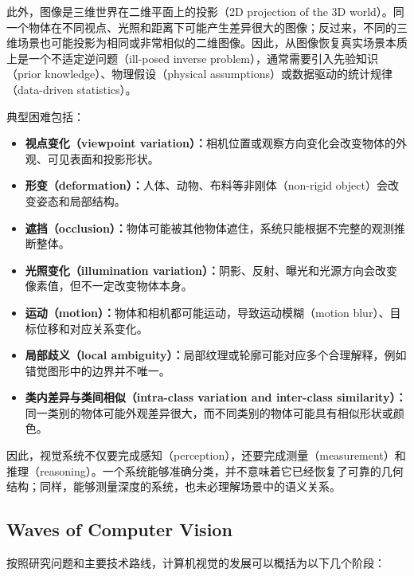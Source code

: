 此外，图像是三维世界在二维平面上的投影（2D projection of the 3D world）。同一个物体在不同视点、光照和距离下可能产生差异很大的图像；反过来，不同的三维场景也可能投影为相同或非常相似的二维图像。因此，从图像恢复真实场景本质上是一个不适定逆问题（ill-posed inverse problem），通常需要引入先验知识（prior knowledge）、物理假设（physical assumptions）或数据驱动的统计规律（data-driven statistics）。

典型困难包括：

\begin{itemize}
    \item \textbf{视点变化（viewpoint variation）：}相机位置或观察方向变化会改变物体的外观、可见表面和投影形状。
    \item \textbf{形变（deformation）：}人体、动物、布料等非刚体（non-rigid object）会改变姿态和局部结构。
    \item \textbf{遮挡（occlusion）：}物体可能被其他物体遮住，系统只能根据不完整的观测推断整体。
    \item \textbf{光照变化（illumination variation）：}阴影、反射、曝光和光源方向会改变像素值，但不一定改变物体本身。
    \item \textbf{运动（motion）：}物体和相机都可能运动，导致运动模糊（motion blur）、目标位移和对应关系变化。
    \item \textbf{局部歧义（local ambiguity）：}局部纹理或轮廓可能对应多个合理解释，例如错觉图形中的边界并不唯一。
    \item \textbf{类内差异与类间相似（intra-class variation and inter-class similarity）：}同一类别的物体可能外观差异很大，而不同类别的物体可能具有相似形状或颜色。
\end{itemize}

因此，视觉系统不仅要完成感知（perception），还要完成测量（measurement）和推理（reasoning）。一个系统能够准确分类，并不意味着它已经恢复了可靠的几何结构；同样，能够测量深度的系统，也未必理解场景中的语义关系。

\subsection{Waves of Computer Vision}

按照研究问题和主要技术路线，计算机视觉的发展可以概括为以下几个阶段：

